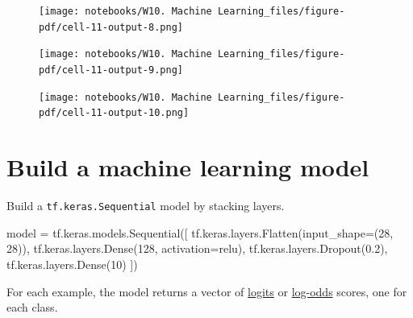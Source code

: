 \documentclass[
  letterpaper,
  DIV=11,
  numbers=noendperiod]{scrreprt}
\newenvironment{Shaded}{\begin{snugshade}}{\end{snugshade}}
\newcommand{\DecValTok}[1]{\textcolor[rgb]{0.68,0.00,0.00}{#1}}
\newcommand{\FloatTok}[1]{\textcolor[rgb]{0.68,0.00,0.00}{#1}}
\newcommand{\NormalTok}[1]{\textcolor[rgb]{0.00,0.23,0.31}{#1}}
\newcommand{\OperatorTok}[1]{\textcolor[rgb]{0.37,0.37,0.37}{#1}}
\newcommand{\StringTok}[1]{\textcolor[rgb]{0.13,0.47,0.30}{#1}}
\begin{document}
\begin{figure}[H]

{\centering \texttt{[image: notebooks/W10. Machine Learning\_files/figure-pdf/cell-11-output-8.png]}

}

\end{figure}

\begin{figure}[H]

{\centering \texttt{[image: notebooks/W10. Machine Learning\_files/figure-pdf/cell-11-output-9.png]}

}

\end{figure}

\begin{figure}[H]

{\centering \texttt{[image: notebooks/W10. Machine Learning\_files/figure-pdf/cell-11-output-10.png]}

}

\end{figure}

\hypertarget{build-a-machine-learning-model}{%
\section{Build a machine learning
model}\label{build-a-machine-learning-model}}

Build a \texttt{tf.keras.Sequential} model by stacking layers.

\begin{Shaded}
\begin{Highlighting}[]
\NormalTok{model }\OperatorTok{=}\NormalTok{ tf.keras.models.Sequential([}
\NormalTok{  tf.keras.layers.Flatten(input\_shape}\OperatorTok{=}\NormalTok{(}\DecValTok{28}\NormalTok{, }\DecValTok{28}\NormalTok{)),}
\NormalTok{  tf.keras.layers.Dense(}\DecValTok{128}\NormalTok{, activation}\OperatorTok{=}\StringTok{\textquotesingle{}relu\textquotesingle{}}\NormalTok{),}
\NormalTok{  tf.keras.layers.Dropout(}\FloatTok{0.2}\NormalTok{),}
\NormalTok{  tf.keras.layers.Dense(}\DecValTok{10}\NormalTok{)}
\NormalTok{])}
\end{Highlighting}
\end{Shaded}

For each example, the model returns a vector of
\href{https://developers.google.com/machine-learning/glossary\#logits}{logits}
or
\href{https://developers.google.com/machine-learning/glossary\#log-odds}{log-odds}
scores, one for each class.
\end{document}

